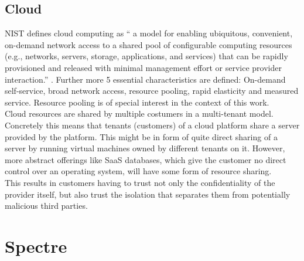 \documentclass[conference,compsoc,final,a4paper]{IEEEtran}
\begin{document}
\subsection{Cloud}
\ac{NIST} defines cloud computing as \enquote{\textelp{} a model for enabling ubiquitous, convenient, on-demand network access to a shared pool of configurable computing resources (e.g., networks, servers, storage, applications, and services) that can be rapidly provisioned and released with minimal management effort or service provider interaction.} \cite{mell2011nist}. Further more 5 essential characteristics are defined: On-demand self-service, broad network access, resource pooling, rapid   elasticity and measured service. Resource pooling is of special interest in the context of this work. \\
Cloud resources are shared by multiple costumers in a multi-tenant model. \cite{mell2011nist} Concretely this means that tenants (customers) of a cloud platform share a server provided by the platform. This might be in form of quite direct sharing of a server by running virtual machines owned by different tenants on it. However, more abstract offerings like \ac{SaaS} databases, which give the customer no direct control over an operating system, will have some form of resource sharing. \\
This results in customers having to trust not only the confidentiality of the provider itself, but also trust the isolation that separates them from potentially malicious third parties.
\section{Spectre}
\end{document}
